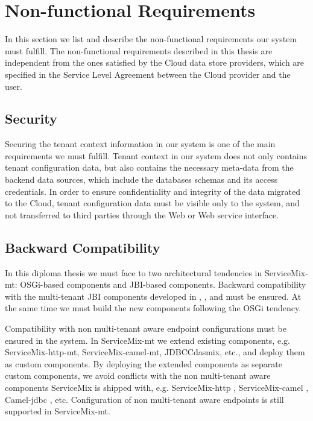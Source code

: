 \section{Non-functional Requirements}
\label{sec:nonfunctionalrequirements}

In this section we list and describe the non-functional requirements our system must fulfill. The non-functional requirements described in this thesis are independent from the ones satisfied by the Cloud data store providers, which are specified in the Service Level Agreement between the Cloud provider and the user. 

\subsection{Security}
Securing the tenant context information in our system is one of the main requirements we must fulfill. Tenant context in our system does not only contains tenant configuration data, but also contains the necessary meta-data from the backend data sources, which include the databases schemas and its access credentials. In order to ensure confidentiality and integrity of the data migrated to the Cloud, tenant configuration data must be visible only to the system, and not transferred to third parties through the Web or Web service interface.

\subsection{Backward Compatibility}
In this diploma thesis we must face to two architectural tendencies in ServiceMix-mt: \ac{OSGi}-based components and \ac{JBI}-based components. Backward compatibility with the multi-tenant \ac{JBI} components developed in \cite{gomez2012}, \cite{Muhler2012}, and \cite{Essl2011} must be ensured. At the same time we must build the new components following the \ac{OSGi} tendency.

Compatibility with non multi-tenant aware endpoint configurations must be ensured in the system. In ServiceMix-mt we extend existing components, e.g. ServiceMix-http-mt, ServiceMix-camel-mt, JDBCCdasmix, etc., and deploy them as custom components. By deploying the extended components as separate custom components, we avoid conflicts with the non multi-tenant aware components ServiceMix is shipped with, e.g. ServiceMix-http \cite{ASM}, ServiceMix-camel \cite{ASM}, Camel-jdbc \cite{cameljdbc}, etc. Configuration of non multi-tenant aware endpoints is still supported in ServiceMix-mt. 

